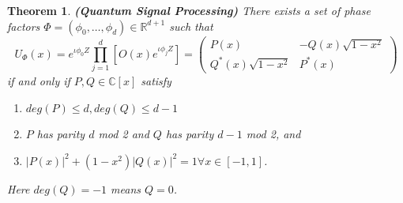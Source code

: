 \documentclass[12pt, oneside]{book}
\newtheorem{theorem}{Theorem}[section]
\theoremstyle{definition}
\theoremstyle{definition}
\theoremstyle{remark}
\begin{document}
\begin{theorem}\label{the:QSP}
    \textbf{(Quantum Signal Processing)} There exists a set of phase factors $\Phi = (\phi_0,\ldots,\phi_d) \in \mathbb{R}^{d+1}$ such that
    \[
    U_{\Phi}(x)=e^{\iota \phi_0Z}\prod_{j=1}^d [O(x)e^{\iota \phi_jZ}] = \begin{pmatrix} P(x) & -Q(x)\sqrt{1-x^2} \\ Q^*(x)\sqrt{1-x^2} & P^*(x) \end{pmatrix}
    \]
    if and only if $P, Q \in \mathbb{C}[x]$ satisfy
    \begin{enumerate}
        \item $deg(P) \leq d, deg(Q) \leq d-1$
        \item $P$ has parity $d$ mod 2 and $Q$ has parity $d-1$ mod 2, and
        \item $|P(x)|^2 + (1-x^2)|Q(x)|^2 = 1 \forall x \in [-1,1]$.
    \end{enumerate}
    Here $deg(Q)=-1$ means $Q=0$.
\end{theorem}
\end{document}

